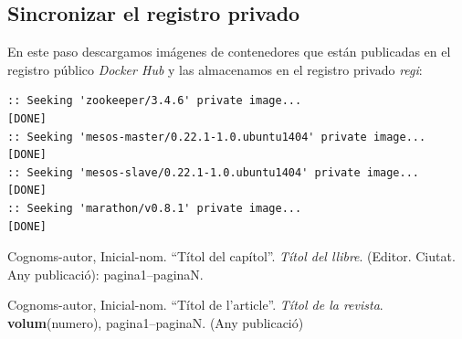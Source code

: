 \documentclass[a4paper,12pt,spanish,final]{epsc_tfc_pfc}
\begin{document}
\subsection{Sincronizar el registro privado}

En este paso descargamos imágenes de contenedores que están publicadas en el registro público \emph{Docker Hub} y las almacenamos en el registro privado \emph{regi}:\\

\begin{lstlisting}[style=dnsmasq]
:: Seeking 'zookeeper/3.4.6' private image...                               [DONE]
:: Seeking 'mesos-master/0.22.1-1.0.ubuntu1404' private image...            [DONE]
:: Seeking 'mesos-slave/0.22.1-1.0.ubuntu1404' private image...             [DONE]
:: Seeking 'marathon/v0.8.1' private image...                               [DONE]
\end{lstlisting}


\begin{thebibliography}{2}


Cognoms-autor, Inicial-nom.
``Títol del capítol''. {\it Títol del llibre}.
(Editor. Ciutat. Any publicació): pagina1--paginaN.

Cognoms-autor, Inicial-nom.
``Títol de l'article''. {\it Títol de la revista}.
{\bf volum}(numero),
pagina1--paginaN. (Any publicació)

\end{thebibliography}
\end{document}
